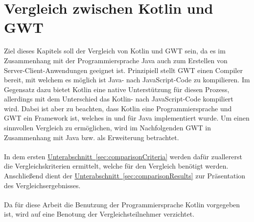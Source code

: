 
\chapter{Vergleich zwischen Kotlin und GWT}\label{sec:comparison}
Ziel dieses Kapitels soll der Vergleich von Kotlin und \gls{GWT} sein, da es im Zusammenhang mit der Programmiersprache Java auch zum Erstellen von Server-Client-Anwendungen geeignet ist. Prinzipiell stellt \gls{GWT} einen Compiler bereit, mit welchem es möglich ist Java- nach JavaScript-Code zu kompilieren. Im Gegensatz dazu bietet Kotlin eine native Unterstützung für diesen Prozess, allerdings mit dem Unterschied das Kotlin- nach JavaScript-Code kompiliert wird. Dabei ist aber zu beachten, dass Kotlin eine Programmiersprache und \gls{GWT} ein Framework ist, welches in und für Java implementiert wurde. Um einen sinnvollen Vergleich zu ermöglichen, wird im Nachfolgenden \gls{GWT} in Zusammenhang mit Java bzw. als Erweiterung betrachtet.\\
\\
In dem ersten \hyperref[sec:comparisonCriteria]{Unterabschnitt~\ref{sec:comparisonCriteria}} werden dafür zuallererst die Vergleichskriterien ermittelt, welche für den Vergleich benötigt werden. Anschließend dient der \hyperref[sec:comparisonResults]{Unterabschnitt~\ref{sec:comparisonResults}} zur Präsentation des Vergleichsergebnisses.\\
\\
Da für diese Arbeit die Benutzung der Programmiersprache Kotlin vorgegeben ist, wird auf eine Benotung der Vergleichsteilnehmer verzichtet.

